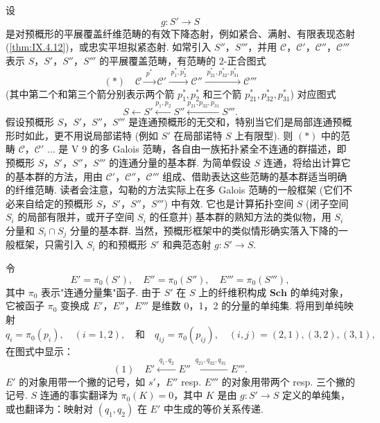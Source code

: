 设
\[
g \colon S' \longrightarrow S
\]
是对预概形的平展覆盖纤维范畴的有效下降态射，例如紧合、满射、有限表现态射 (\cref{thm:IX.4.12})，或忠实平坦拟紧态射. 如常引入 $S''$，$S'''$，并用 $\mathcal{C}$，$\mathcal{C}'$，$\mathcal{C}''$，$\mathcal{C}'''$ 表示 $S$，$S'$，$S''$，$S'''$ 的平展覆盖范畴，有范畴的 2-正合图式
\[
(\ast) \quad \mathcal{C} \xrightarrow{\;p^{*}\;} \mathcal{C}' \xrightarrow{\;p_1^{*}, p_2^{*}\;} \mathcal{C}'' \xrightarrow{\;p_{21}^{*}, p_{32}^{*}, p_{31}^{*}\;} \mathcal{C}'''
\]
(其中第二个和第三个箭分别表示两个箭 $p_1^{*}, p_2^{*}$ 和三个箭 $p_{21}^{*}, p_{32}^{*}, p_{31}^{*}$) 对应图式
\[
S \longleftarrow S' \xleftarrow{p_1, p_2} S'' \xleftarrow{p_{21}, p_{32}, p_{31}} S'''.
\]
假设预概形 $S$，$S'$，$S''$，$S'''$ 是连通预概形的无交和，特别当它们是局部连通预概形时如此，更不用说局部诺特 (例如 $S'$ 在局部诺特 $S$ 上有限型). 则 $(\ast)$ 中的范畴 $\mathcal{C}$，$\mathcal{C}'$ ... 是 V 9 的多 Galois 范畴，各自由一族拓扑紧全不连通的群描述，即预概形 $S$，$S'$，$S''$，$S'''$ 的连通分量的基本群. 为简单假设 $S$ 连通，将给出计算它的基本群的方法，用由 $\mathcal{C}'$，$\mathcal{C}''$，$\mathcal{C}'''$ 组成、借助表达这些范畴的基本群适当明确的纤维范畴. 读者会注意，勾勒的方法实际上在多 Galois 范畴的一般框架 (它们不必来自给定的预概形 $S$，$S'$，$S''$，$S'''$) 中有效. 它也是计算拓扑空间 $S$ (闭子空间 $S_i$ 的局部有限并，或开子空间 $S_i$ 的任意并) 基本群的熟知方法的类似物，用 $S_i$ 分量和 $S_i \cap S_j$ 分量的基本群. 当然，预概形框架中的类似情形确实落入下降的一般框架，只需引入 $S_i$ 的和预概形 $S'$ 和典范态射 $g \colon S' \to S$.

令
\[
E' = \pi_0(S'), \quad E'' = \pi_0(S''), \quad E''' = \pi_0(S'''),
\]
其中 $\pi_0$ 表示"连通分量集"函子. 由于 $S'$ 在 $S$ 上的纤维积构成 $\mathbf{Sch}$ 的单纯对象，它被函子 $\pi_0$ 变换成 $E'$，$E''$，$E'''$ 是维数 0，1，2 的分量的单纯集. 将用到单纯映射
\[
q_i = \pi_0(p_i), \quad (i = 1, 2), \quad \text{和} \quad q_{ij} = \pi_0(p_{ij}), \quad (i, j) = (2, 1), (3, 2), (3, 1),
\]
在图式中显示：
\[
(1) \quad E' \xleftarrow{\;q_1, q_2\;} E'' \xleftarrow{\;q_{21}, q_{32}, q_{31}\;} E'''.
\]
$E'$ 的对象用带一个撇的记号，如 $s'$，$E''$ resp. $E'''$ 的对象用带两个 resp. 三个撇的记号. $S$ 连通的事实翻译为 $\pi_0(K) = 0$，其中 $K$ 是由 $g \colon S' \to S$ 定义的单纯集，或也翻译为：映射对 $(q_1, q_2)$ 在 $E'$ 中生成的等价关系传递.

